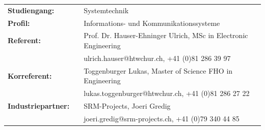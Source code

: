 \begin{titlepage}
\begin{center}
	 \normalsize
	 	{
			\begin{tabular}{lll}
				\textbf{Studiengang:} & & Systemtechnik\\
				\textbf{Profil:} & & Informations- und Kommunikationssysteme\\
				\textbf{Referent:} & & Prof. Dr. Hauser-Ehninger Ulrich, MSc in Electronic Engineering\\
				\textbf{ } & & ulrich.hauser@htwchur.ch, +41 (0)81 286 39 97\\
				\textbf{Korreferent:} & & Toggenburger Lukas, Master of Science FHO in Engineering\\
				\textbf{ } & & lukas.toggenburger@htwchur.ch, +41 (0)81 286 27 22\\
				\textbf{Industriepartner:} & & SRM-Projects, Joeri Gredig\\
				\textbf{ } & & joeri.gredig@srm-projects.ch, +41 (0)79 340 44 85\\
			\end{tabular}
	    }
    \end{center}
\end{titlepage}

